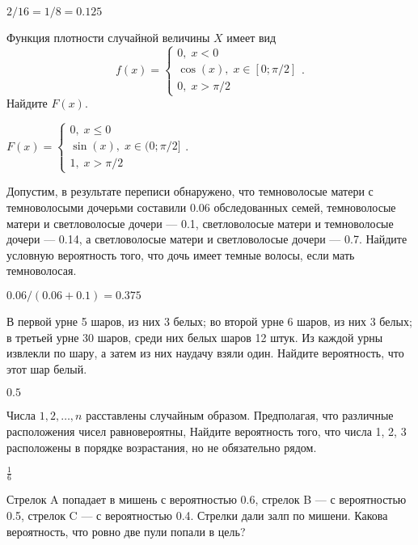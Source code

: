 \documentclass[12pt, addpoints, answers]{exam} %
\begin{document}
\begin{questions}
\begin{solution}
 $2/16=1/8=0.125$
\end{solution}

\question Функция плотности случайной величины $X$ имеет вид
\[
f(x)=\begin{cases}
0, \; x < 0 \\
\cos(x), \; x \in [0;\pi/2] \\
0, \; x > \pi/2
\end{cases}.
\]
Найдите $F(x)$.



\begin{solution}
$
F(x)=\begin{cases}
0, \; x\leq 0 \\
\sin(x), \; x \in (0;\pi/2] \\
1, \; x > \pi/2
\end{cases}.
$
\end{solution}

\question Допустим, в результате переписи обнаружено, что темноволосые матери с темноволосыми дочерьми составили 0.06 обследованных семей, темноволосые матери и светловолосые дочери --- 0.1, светловолосые матери и темноволосые дочери --- 0.14, а светловолосые матери и светловолосые дочери --- 0.7. Найдите условную вероятность того, что дочь имеет темные волосы, если мать темноволосая.

\begin{solution}
 $0.06/(0.06+0.1)=0.375$
\end{solution}

\question В первой урне 5 шаров, из них 3 белых; во второй урне 6 шаров, из них 3 белых; в третьей урне 30 шаров, среди них белых шаров 12 штук. Из каждой урны извлекли по шару, а затем из них наудачу взяли один. Найдите вероятность, что этот шар белый.


\begin{solution}
 $0.5$
\end{solution}

\question Числа $1, 2, \ldots , n$ расставлены случайным образом. Предполагая, что различные расположения чисел равновероятны, Найдите вероятность того, что числа 1, 2, 3 расположены в порядке
возрастания, но не обязательно рядом.


\begin{solution}
 $\frac{1}{6}$
\end{solution}

\question Стрелок A попадает в мишень с вероятностью 0.6, стрелок B --- с вероятностью 0.5, стрелок C --- с вероятностью 0.4. Стрелки дали залп по мишени. Какова вероятность, что ровно две пули попали в цель?


\end{questions}
\end{document}
